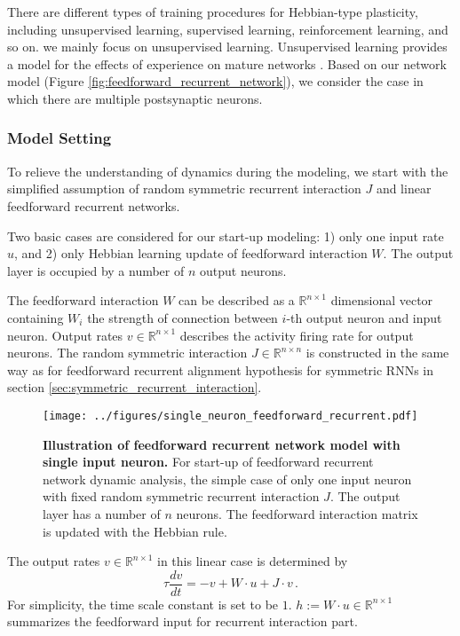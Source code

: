 \documentclass[11pt]{article}
\begin{document}
	There are different types of training procedures for Hebbian-type plasticity, including unsupervised learning, supervised learning, reinforcement learning, and so on. we mainly focus on unsupervised learning. Unsupervised learning provides a model for the effects of experience on mature networks \cite{dayan2005theoretical}. Based on our network model (Figure \ref{fig:feedforward_recurrent_network}), we consider the case in which there are multiple postsynaptic neurons. 
	
	\subsubsection{Model Setting}
	To relieve the understanding of dynamics during the modeling, we start with the simplified assumption of random symmetric recurrent interaction $J$ and linear feedforward recurrent networks.
	
	Two basic cases are considered for our start-up modeling: 1) only one input rate $u$, and 2) only Hebbian learning update of feedforward interaction $W$. The output layer is occupied by a number of $n$ output neurons. 
	
	The feedforward interaction $W$ can be described as a $\mathbb{R}^{n \times 1}$ dimensional vector containing $W_i$ the strength of connection between $i$-th output neuron and input neuron. Output rates $v \in \mathbb{R}^{n \times 1}$ describes the activity firing rate for output neurons. The random symmetric interaction $J \in \mathbb{R}^{n \times n}$ is constructed in the same way as for feedforward recurrent alignment hypothesis for symmetric RNNs in section \ref{sec:symmetric_recurrent_interaction}. 
	
		\begin{figure}[H]
			\centering
			\texttt{[image: ../figures/single\_neuron\_feedforward\_recurrent.pdf]}
			\caption[Illustration of feedforward recurrent network model with single input neuron]{\textbf{Illustration of feedforward recurrent network model with single input neuron.} For start-up of feedforward recurrent network dynamic analysis, the simple case of only one input neuron with fixed random symmetric recurrent interaction $J$. The output layer has a number of $n$ neurons. The feedforward interaction matrix is updated with the Hebbian rule.}
			\label{fig:single_neuron_feedforward_recurrent_network}
		\end{figure}
	
	The output rates $v \in \mathbb{R}^{n \times 1}$ in this linear case is determined by 
		\begin{equation} \label{eq:response_ffrec_network}
			\tau \frac{dv}{dt} = -v + W \cdot u + J \cdot v \,.
		\end{equation}
	For simplicity, the time scale constant is set to be $1$. $h := W \cdot u \in \mathbb{R}^{n \times 1}$ summarizes the feedforward input for recurrent interaction part. 
	
\end{document}
